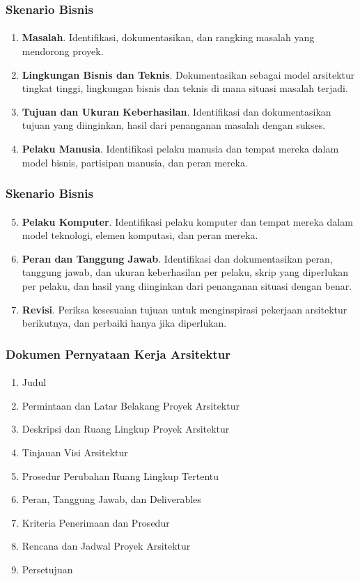 \documentclass[aspectratio=169, table]{beamer}
\begin{document}
	
	
	\begin{frame}
		\frametitle{Skenario Bisnis}
		\framesubtitle{\hspace{1cm}}
		\begin{enumerate}
			\item \textbf{Masalah}.
			Identifikasi, dokumentasikan, dan rangking masalah yang mendorong proyek.
			\item \textbf{Lingkungan Bisnis dan Teknis}.
			Dokumentasikan sebagai model arsitektur tingkat tinggi, lingkungan bisnis dan teknis di mana situasi masalah terjadi.
			\item \textbf{Tujuan dan Ukuran Keberhasilan}.
			Identifikasi dan dokumentasikan tujuan yang diinginkan, hasil dari penanganan masalah dengan sukses.
			\item \textbf{Pelaku Manusia}.
			Identifikasi pelaku manusia dan tempat mereka dalam model bisnis, partisipan manusia, dan peran mereka.
			
		\end{enumerate}
	\end{frame}
	
	\begin{frame}
		\frametitle{Skenario Bisnis}
		\framesubtitle{\hspace{1cm}}
		\begin{enumerate}
			\setcounter{enumi}{4}
			\item \textbf{Pelaku Komputer}.
			Identifikasi pelaku komputer dan tempat mereka dalam model teknologi, elemen komputasi, dan peran mereka.
			\item \textbf{Peran dan Tanggung Jawab}.
			Identifikasi dan dokumentasikan peran, tanggung jawab, dan ukuran keberhasilan per pelaku, skrip yang diperlukan per pelaku, dan hasil yang diinginkan dari penanganan situasi dengan benar.
			\item \textbf{Revisi}.
			Periksa kesesuaian tujuan untuk menginspirasi pekerjaan arsitektur berikutnya, dan perbaiki hanya jika diperlukan.
		\end{enumerate}
	\end{frame}
	
	\begin{frame}
		\frametitle{Dokumen Pernyataan Kerja Arsitektur}
		\framesubtitle{\hspace{1cm}}
		\begin{enumerate}
			\item Judul
			\item Permintaan dan Latar Belakang Proyek Arsitektur
			\item Deskripsi dan Ruang Lingkup Proyek Arsitektur
			\item Tinjauan Visi Arsitektur
			\item Prosedur Perubahan Ruang Lingkup Tertentu
			\item Peran, Tanggung Jawab, dan Deliverables
			\item Kriteria Penerimaan dan Prosedur
			\item Rencana dan Jadwal Proyek Arsitektur
			\item Persetujuan
		\end{enumerate}
	\end{frame}
	
\end{document}
